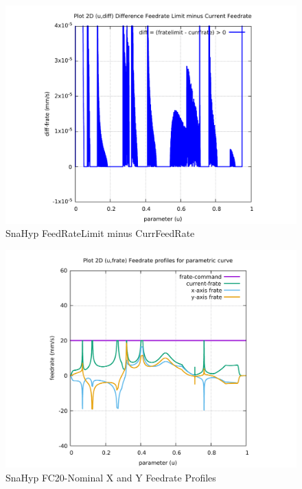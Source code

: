 \begin{figure}
	\caption     {SnaHyp FeedRateLimit minus CurrFeedRate}
	\label{12-img-SnaHyp-FeedRateLimit-minus-CurrFeedRate.pdf}
\includegraphics[width=1.00\textwidth]{Chap4/appendix/app-SnaHyp/plots/12-img-SnaHyp-FeedRateLimit-minus-CurrFeedRate.pdf}
\end{figure}

\clearpage
\pagebreak

\begin{figure}
	\caption     {SnaHyp FC20-Nominal X and Y Feedrate Profiles}
	\label{13-img-SnaHyp-FC20-Nominal-X-and-Y-Feedrate-Profiles.pdf}
\includegraphics[width=1.00\textwidth]{Chap4/appendix/app-SnaHyp/plots/13-img-SnaHyp-FC20-Nominal-X-and-Y-Feedrate-Profiles.pdf}
\end{figure}


